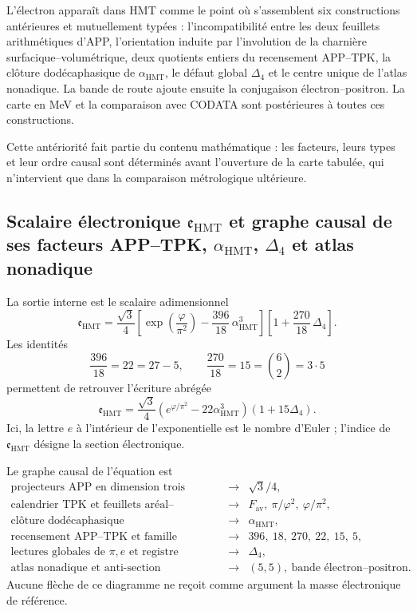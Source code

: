 L'électron apparaît dans HMT comme le point où s'assemblent six
constructions antérieures et mutuellement typées : l'incompatibilité entre
les deux feuillets arithmétiques d'APP, l'orientation induite par l'involution
de la charnière surfacique--volumétrique, deux quotients entiers du recensement APP--TPK,
la clôture
dodécaphasique de \(\alpha_{\mathrm{HMT}}\), le défaut global
\(\Delta_4\) et le centre unique de l'atlas nonadique. La bande de route ajoute
ensuite la conjugaison électron--positron. La carte en MeV et la comparaison
avec CODATA sont postérieures à toutes ces constructions.

Cette antériorité fait partie du contenu mathématique : les facteurs, leurs
types et leur ordre causal sont déterminés avant l'ouverture de la carte tabulée, qui
n'intervient que dans la comparaison métrologique ultérieure.

\subsection{Scalaire électronique \(\mathfrak e_{\mathrm{HMT}}\) et graphe causal de ses facteurs APP–TPK, \(\alpha_{\mathrm{HMT}}\), \(\Delta_4\) et atlas nonadique}

La sortie interne est le scalaire adimensionnel
\begin{equation}
 \label{p12-83-c15-s2:eq:electron-holografico-rev6}
 \boxed{
 \mathfrak e_{\mathrm{HMT}}
 =
 \frac{\sqrt3}{4}
 \left[
 \exp\!\left(\frac{\varphi}{\pi^2}\right)
 -\frac{396}{18}\,\alpha_{\mathrm{HMT}}^3
 \right]
 \left[
 1+\frac{270}{18}\,\Delta_4
 \right].}
\end{equation}
Les identités
\[
 \frac{396}{18}=22=27-5,
 \qquad
 \frac{270}{18}=15=\binom62=3\cdot5
 \]
permettent de retrouver l'écriture abrégée
\[
 \mathfrak e_{\mathrm{HMT}}
 =
 \frac{\sqrt3}{4}
 \left(e^{\varphi/\pi^2}-22\alpha_{\mathrm{HMT}}^3\right)
 (1+15\Delta_4).
\]
Ici, la lettre \(e\) à l'intérieur de l'exponentielle est le nombre d'Euler ;
l'indice de \(\mathfrak e_{\mathrm{HMT}}\) désigne la section électronique.

Le graphe causal de l'équation est
\[
\begin{array}{ccl}
\text{projecteurs APP en dimension trois}
&\longrightarrow& \sqrt3/4,\\[2mm]
\text{calendrier TPK et feuillets aréal--volumétrique}
&\longrightarrow&
F_{\mathrm{av}},\ \pi/\varphi^2,\
\varphi/\pi^2,\\[2mm]
\text{clôture dodécaphasique}
&\longrightarrow&\alpha_{\mathrm{HMT}},\\[2mm]
\text{recensement APP--TPK et famille électronique}
&\longrightarrow&396,\ 18,\ 270,\ 22,\ 15,\ 5,\\[2mm]
\text{lectures globales de }\pi,e\text{ et registre}
&\longrightarrow&\Delta_4,\\[2mm]
\text{atlas nonadique et anti-section}
&\longrightarrow&(5,5),\
\text{bande électron--positron}.
\end{array}
\]
Aucune flèche de ce diagramme ne reçoit comme argument la masse électronique
de référence.

